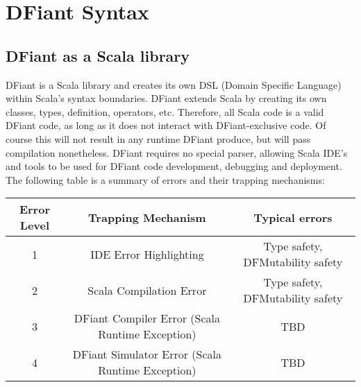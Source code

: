 \chapter{DFiant Syntax}

\section{DFiant as a Scala library}
DFiant is a Scala library and creates its own DSL (Domain Specific Language) within Scala's syntax boundaries. DFiant extends Scala by creating its own classes, types, definition, operators, etc. Therefore, all Scala code is a valid DFiant code, as long as it does not interact with DFiant-exclusive code. Of course this will not result in any runtime DFiant produce, but will pass compilation nonetheless. DFiant requires no special parser, allowing Scala IDE's and tools to be used for DFiant code development, debugging and deployment.\\

The following table is a summary of errors and their trapping mechanisms:\\
\begin{tabular}{||c|c|c||}
	\hline 
	Error Level & Trapping Mechanism 				& Typical errors \\ 
	\hline 
	1 					& IDE Error Highlighting 		& Type safety, DFMutability safety \\ 
	\hline 
	2 					& Scala Compilation Error 	& Type safety, DFMutability safety \\ 
	\hline 
	3 					& DFiant Compiler Error 
	              (Scala Runtime Exception) & TBD \\ 
	\hline 
	4 					& DFiant Simulator Error 
	              (Scala Runtime Exception) & TBD \\ 
	\hline 
\end{tabular} \\
\vfill
\newpage

